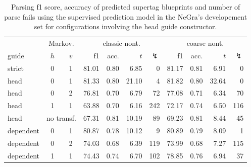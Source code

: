 \documentclass[../../document.tex]{subfiles}
\begin{document}
    
    \begin{table}
        \caption{\label{tbl:gridsearch:head:2}
        Parsing f1 score, accuracy of predicted supertag blueprints and number of parse fails using the supervised prediction model in the NeGra's developement set for configurations involving the head guide constructor.
        }
        \centering
        \vspace{.2cm}
        \begin{tabular}{lcc|rrrr|rrrr}
            \toprule
            & \multicolumn{2}{c|}{Markov.} & \multicolumn{4}{c|}{classic nont.} &  \multicolumn{4}{c}{coarse nont.} \\
guide           & \(h\) & \(v\) & f1 & acc. & $t$ & $\lightning$ & f1 & acc. & $t$ & $\lightning$  \\ \hline \rowcolor{black!10}
strict         & \(0\) & \(1\) & 81.01 & 0.80 & 6.85 &0 & 81.17 & 0.81 & 6.91 & 0 \\\hline
head & 0 & 1 & 81.33 & 0.80 & 21.10 & 4 & 81.82 & 0.80 & 32.64 & 0 \\
head & 0 & 2 & 76.81 & 0.70 & 6.79 & 72 & 77.08 & 0.71 & 6.34 & 70 \\
head & 1 & 1 & 63.88 & 0.70 & 6.16 & 242 & 72.17 & 0.74 & 6.50 & 116 \\
head & \multicolumn{2}{c|}{no transf.} & 67.31 & 0.81 & 10.19 & 89 & 69.23 & 0.81 & 8.44 & 45  \\\hline
dependent & 0 & 1 & 80.87 & 0.78 & 10.12 & 9 & 80.89 & 0.79 & 8.09 & 1 \\
dependent & 0 & 2 & 74.03 & 0.68 & 6.39 & 119 & 73.99 & 0.68 & 7.27 & 115 \\
dependent & 1 & 1 & 74.43 & 0.74 & 6.70 & 102 & 78.85 & 0.76 & 6.94 & 37 \\
\bottomrule
        \end{tabular}
    \end{table}
\end{document}
